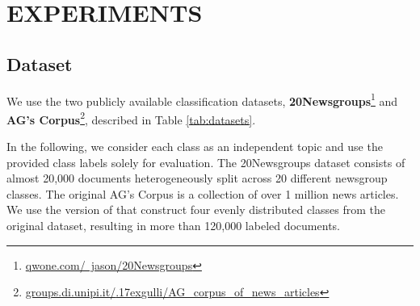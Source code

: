 \documentclass[a4paper,twoside]{article}
\begin{document}
\section{\uppercase{Experiments}}
\label{sec:experiments}

\subsection{Dataset}
We use the two publicly available classification datasets, \textbf{20Newsgroups}\footnote{\href{http://qwone.com/~jason/20Newsgroups}{qwone.com/~jason/20Newsgroups}} and \textbf{AG's Corpus}\footnote{\href{http://groups.di.unipi.it/~gulli/AG_corpus_of_news_articles}{groups.di.unipi.it/{\raise.17ex\hbox{}}gulli/AG\_corpus\_of\_news\_articles}}, described in Table \ref{tab:datasets}. 
\begin{table}[ht]
    \centering
    \caption{\label{tab:datasets}Summary of the used classification datasets.}
\end{table}
In the following, we consider each class as an independent topic and use the provided class labels solely for evaluation. The 20Newsgroups dataset consists of almost 20,000 documents heterogeneously split across 20 different newsgroup classes. The original AG's Corpus is a collection of over 1 million news articles. We use the version of \citet{zhang-et-al-2015} that construct four evenly distributed classes from the original dataset, resulting in more than 120,000 labeled documents.
\end{document}
